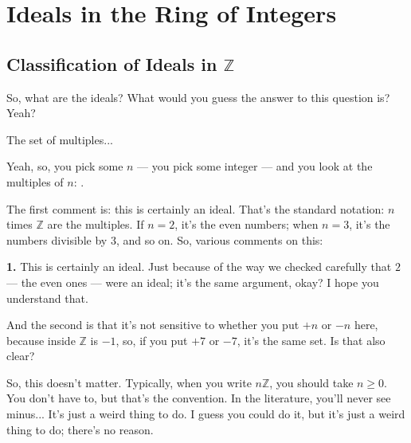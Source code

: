\section{Ideals in the Ring of Integers}

\subsection{Classification of Ideals in \texorpdfstring{$\mathbb{Z}$}{Z}}

\begin{speech}[00:47:40 - 00:47:46]
So, what are the ideals?  What would you guess the answer to this question is? Yeah?
\end{speech}

\begin{student}
The set of multiples...
\end{student}

\begin{speech}[00:47:48 - 00:49:02]
Yeah, so, you pick some $n$ ---  you pick some integer --- and you look at the multiples of $n$: .

The first comment is: this is certainly an ideal.  That's the standard notation: $n$ times $\mathbb{Z}$ are the multiples. If $n = 2$, it's the even numbers; when $n = 3$, it's the numbers divisible by $3$, and so on. So, various comments on this: 

\textbf{1.} This is certainly an ideal. Just because of the way we checked carefully that $2$ --- the even ones --- were an ideal; it's the same argument, okay? I hope you understand that.

And the second is that it's not sensitive to whether you put $+n$ or $-n$ here, because inside $\mathbb{Z}$ is $-1$, so, if you put $+7$ or $-7$, it's the same set. Is that also clear? 

So, this doesn't matter. Typically, when you write $n\mathbb{Z}$,  you should take $n \ge 0$. You don't have to, but that's the convention. In the literature, you'll never see minus... It's just a weird thing to do. I guess you could do it, but it's just a weird thing to do; there's no reason.
\end{speech}

